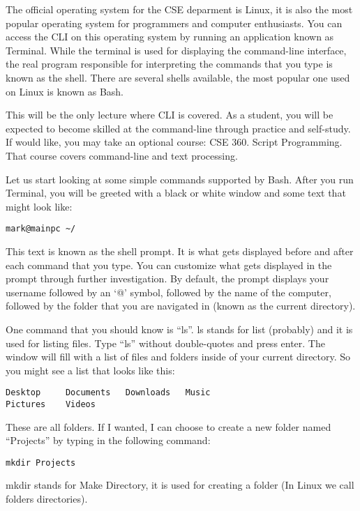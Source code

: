 \documentclass[a4paper,12pt]{article}
\begin{document}
The official operating system for the CSE deparment is Linux, it is also the most popular operating system for programmers and computer enthusiasts. You can access the CLI on this operating system by running an application known as Terminal. While the terminal is used for displaying the command-line interface, the real program responsible for interpreting the commands that you type is known as the shell. There are several shells available, the most popular one used on Linux is known as Bash.

This will be the only lecture where CLI is covered. As a student, you will be expected to become skilled at the command-line through practice and self-study. If would like, you may take an optional course: CSE 360. Script Programming. That course covers command-line and text processing.


Let us start looking at some simple commands supported by Bash. After you run Terminal, you will be greeted with a black or white window and some text that might look like:

\begin{lstlisting}
mark@mainpc ~/
\end{lstlisting}

This text is known as the shell prompt. It is what gets displayed before and after each command that you type. You can customize what gets displayed in the prompt through further investigation. By default, the prompt displays your username followed by an `@' symbol, followed by the name of the computer, followed by the folder that you are navigated in (known as the current directory).

One command that you should know is ``ls''. ls stands for list (probably) and it is used for listing files. Type ``ls'' without double-quotes and press enter. The window will fill with a list of files and folders inside of your current directory. So you might see a list that looks like this:

\begin{lstlisting}
Desktop		Documents	Downloads	Music
Pictures	Videos
\end{lstlisting}

These are all folders. If I wanted, I can choose to create a new folder named ``Projects'' by typing in the following command:
\begin{lstlisting}
mkdir Projects
\end{lstlisting}
mkdir stands for Make Directory, it is used for creating a folder (In Linux we call folders directories).
\end{document}
